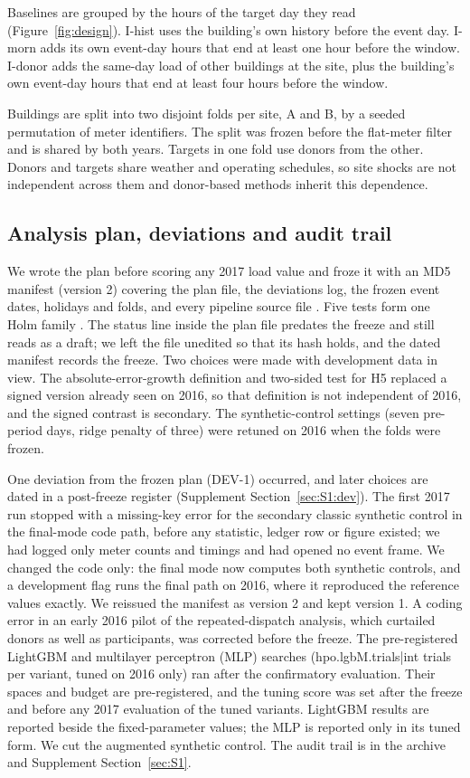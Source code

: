 Baselines are grouped by the hours of the target day they read (Figure~\ref{fig:design}). I-hist uses the building's own history before the event day. I-morn adds its own event-day hours that end at least one hour before the window. I-donor adds the same-day load of other buildings at the site, plus the building's own event-day hours that end at least four hours before the window.

Buildings are split into two disjoint folds per site, A and B, by a seeded permutation of meter identifiers. The split was frozen before the flat-meter filter and is shared by both years. Targets in one fold use donors from the other. Donors and targets share weather and operating schedules, so site shocks are not independent across them and donor-based methods inherit this dependence.

\subsection{Analysis plan, deviations and audit trail}
\label{sec:data:plan}

We wrote the plan before scoring any 2017 load value and froze it with an MD5 manifest (version 2) covering the plan file, the deviations log, the frozen event dates, holidays and folds, and every pipeline source file \citep{nosek2018}. Five tests form one Holm family \citep{holm1979}. The status line inside the plan file predates the freeze and still reads as a draft; we left the file unedited so that its hash holds, and the dated manifest records the freeze. Two choices were made with development data in view. The absolute-error-growth definition and two-sided test for H5 replaced a signed version already seen on 2016, so that definition is not independent of 2016, and the signed contrast is secondary. The synthetic-control settings (seven pre-period days, ridge penalty of three) \citep{sievers2026} were retuned on 2016 when the folds were frozen.

One deviation from the frozen plan (DEV-1) occurred, and later choices are dated in a post-freeze register (Supplement Section~\ref{sec:S1:dev}). The first 2017 run stopped with a missing-key error for the secondary classic synthetic control in the final-mode code path, before any statistic, ledger row or figure existed; we had logged only meter counts and timings and had opened no event frame. We changed the code only: the final mode now computes both synthetic controls, and a development flag runs the final path on 2016, where it reproduced the reference values exactly. We reissued the manifest as version 2 and kept version 1. A coding error in an early 2016 pilot of the repeated-dispatch analysis, which curtailed donors as well as participants, was corrected before the freeze. The pre-registered LightGBM and multilayer perceptron (MLP) searches ({{hpo.lgbM.trials|int}} trials per variant, tuned on 2016 only) ran after the confirmatory evaluation. Their spaces and budget are pre-registered, and the tuning score was set after the freeze and before any 2017 evaluation of the tuned variants. LightGBM results are reported beside the fixed-parameter values; the MLP is reported only in its tuned form. We cut the augmented synthetic control. The audit trail is in the archive and Supplement Section~\ref{sec:S1}.
